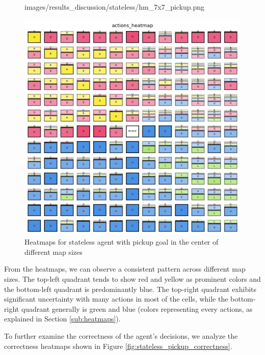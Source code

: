 \begin{figure}[h]
\begin{minipage}[b]{0.32\textwidth}
{      images/results_discussion/stateless/hm_7x7_pickup.png
    }
    \caption{7x7}
    \label{fig:hm_7x7_pickup}
  \end{minipage}
  \hfill
  \begin{minipage}[b]{0.32\textwidth}
    \centering
    \includegraphics[width=\textwidth]{
      images/results_discussion/stateless/hm_13x13_pickup.png
    }
    \caption{13x13}
    \label{fig:hm_13x13_pickup}
  \end{minipage}
  \caption{Heatmaps for stateless agent with pickup goal in the center of
  different map sizes}
  \label{fig:stateless_pickup_heatmaps}
\end{figure}
\vspace{5mm}

From the heatmaps, we can observe a consistent pattern across different map
sizes. The top-left quadrant tends to show red and yellow as prominent colors and
the bottom-left quadrant is predominantly blue. The top-right quadrant exhibits
significant uncertainty with many actions in most of the cells, while the bottom-right
quadrant generally is green and blue (colors representing every actions, as explained
in Section \ref{sub:heatmaps}).

To further examine the correctness of the agent's decisions, we analyze the correctness
heatmaps shown in Figure \ref{fig:stateless_pickup_correctness}.

